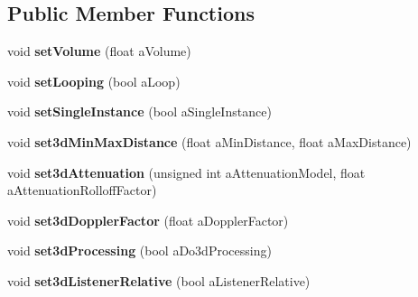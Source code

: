 \subsection*{Public Member Functions}
\begin{DoxyCompactItemize}
\item 
\mbox{\label{class_so_loud_1_1_audio_source_a131aebb933216574269ce7f394b95b37}} 
void {\bfseries set\+Volume} (float a\+Volume)
\item 
\mbox{\label{class_so_loud_1_1_audio_source_ad62577bf3b28507cf00fec8122ed3699}} 
void {\bfseries set\+Looping} (bool a\+Loop)
\item 
\mbox{\label{class_so_loud_1_1_audio_source_a531a9b365bcfcf789f5b7ba187d80379}} 
void {\bfseries set\+Single\+Instance} (bool a\+Single\+Instance)
\item 
\mbox{\label{class_so_loud_1_1_audio_source_a2d9daeee1549be617f7e54038296ea1f}} 
void {\bfseries set3d\+Min\+Max\+Distance} (float a\+Min\+Distance, float a\+Max\+Distance)
\item 
\mbox{\label{class_so_loud_1_1_audio_source_a1c0cee35631865009ab32a30ed5c282c}} 
void {\bfseries set3d\+Attenuation} (unsigned int a\+Attenuation\+Model, float a\+Attenuation\+Rolloff\+Factor)
\item 
\mbox{\label{class_so_loud_1_1_audio_source_a4dfd2587466142df4d2633ef39f72929}} 
void {\bfseries set3d\+Doppler\+Factor} (float a\+Doppler\+Factor)
\item 
\mbox{\label{class_so_loud_1_1_audio_source_aae197c89ba755873a0fd5bf4ef322ba4}} 
void {\bfseries set3d\+Processing} (bool a\+Do3d\+Processing)
\item 
\mbox{\label{class_so_loud_1_1_audio_source_a886f886e285bc72719c1255409088525}} 
void {\bfseries set3d\+Listener\+Relative} (bool a\+Listener\+Relative)
\item 
\mbox{\label{class_so_loud_1_1_audio_source_a669e5d05c0ff5c4e55c6a19ac2660988}} 

\end{DoxyCompactItemize}
